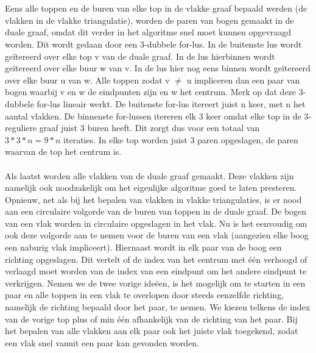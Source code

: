 \documentclass[11pt, a4paper, table]{article}
\theoremstyle{definition}
\theoremstyle{definition}
\theoremstyle{definition}
\begin{document}
\\\\Eens alle toppen en de buren van elke top in de vlakke graaf bepaald werden (de vlakken in de vlakke triangulatie), worden de paren van bogen gemaakt in de duale graaf, omdat dit verder in het algoritme snel moet kunnen opgevraagd worden. Dit wordt gedaan door een 3-dubbele for-lus. In de buitenste lus wordt ge\"{i}tereerd over elke top v van de duale graaf. In de lus hierbinnen wordt ge\"{i}tereerd over elke buur w van v. In de lus hier nog eens binnen wordt ge\"{i}tereerd over elke buur u van w. Alle toppen zodat v $\neq$ u impliceren dan een paar van bogen waarbij v en w de eindpunten zijn en w het centrum. Merk op dat deze 3-dubbele for-lus lineair werkt. De buitenste for-lus itereert juist n keer, met n het aantal vlakken. De binnenste for-lussen itereren elk 3 keer omdat elke top in de 3-reguliere graaf juist 3 buren heeft. Dit zorgt dus voor een totaal van $3*3*n = 9*n$ iteraties. In elke top worden juist 3 paren opgeslagen, de paren waarvan de top het centrum is. 
\\\\Als laatst worden alle vlakken van de duale graaf gemaakt. Deze vlakken zijn namelijk ook noodzakelijk om het eigenlijke algoritme goed te laten presteren. Opnieuw, net als bij het bepalen van vlakken in vlakke triangulaties, is er nood aan een circulaire volgorde van de buren van toppen in de duale graaf. De bogen van een vlak worden in circulaire opgeslagen in het vlak. Nu is het eenvoudig om ook deze volgorde aan te nemen voor de buren van een vlak (aangezien elke boog een naburig vlak impliceert). Hiernaast wordt in elk paar van de boog een richting opgeslagen. Dit vertelt of de index van het centrum met \'{e}\'{e}n verhoogd of verlaagd moet worden van de index van een eindpunt om het andere eindpunt te verkrijgen. Nemen we de twee vorige ide\"{e}en, is het mogelijk om te starten in een paar en alle toppen in een vlak te overlopen door steeds eenzelfde richting, namelijk de richting bepaald door het paar, te nemen.  We kiezen telkens de index van de vorige top plus of min \'{e}\'{e}n afhankelijk van de richting van het paar. Bij het bepalen van alle vlakken aan elk paar ook het juiste vlak toegekend, zodat een vlak snel vanuit een paar kan gevonden worden. 
\end{document}
